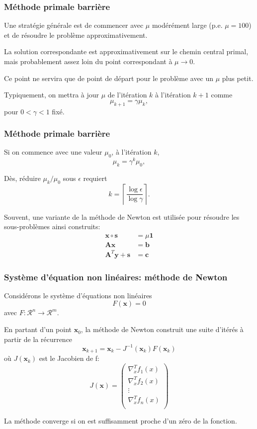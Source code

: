 \documentclass[usepdftitle=false]{beamer}
\def\bb{\boldsymbol{b}}
\def\bc{\boldsymbol{c}}
\def\bs{\boldsymbol{s}}
\def\bx{\boldsymbol{x}}
\def\by{\boldsymbol{y}}
\def\bA{\boldsymbol{A}}
\def\bone{\boldsymbol{1}}
\def\RR {\mathcal{R}}
\begin{document}
\begin{frame}
\frametitle{Méthode primale barrière}

Une stratégie générale est de commencer avec $\mu$ modérément large (p.e. $\mu = 100$) et de résoudre le problème approximativement.

\mbox{}

La solution correspondante est approximativement sur le chemin central primal, mais probablement assez loin du point correspondant à $\mu \rightarrow 0$.

\mbox{}

Ce point ne servira que de point de départ pour le problème avec un $\mu$ plus petit.

\mbox{}

Typiquement, on mettra à jour $\mu$ de l'itération $k$ à l'itération $k+1$ comme
\[
\mu_{k+1} = \gamma \mu_k,
\]
pour $0< \gamma < 1$ fixé.

\end{frame}

\begin{frame}
\frametitle{Méthode primale barrière}

Si on commence avec une valeur $\mu_0$, à l'itération $k$,
\[
\mu_{k} = \gamma^k \mu_0,
\]

\mbox{}

Dès, réduire $\mu_k/\mu_0$ sous $\epsilon$ requiert
\[
k = \left\lceil \frac{\log \epsilon}{\log \gamma} \right\rceil.
\]

\mbox{}

Souvent, une variante de la méthode de Newton est utilisée pour résoudre les sous-problèmes ainsi construits:
\begin{align*}
\bx \circ \bs &= \mu \bone \\
\bA\bx &= \bb \\
\bA^T\by + \bs & = \bc
\end{align*}

\end{frame}

\begin{frame}
\frametitle{Système d'équation non linéaires: méthode de Newton}

Considérons le système d'équations non linéaires
$$
F(\bx) = 0
$$
avec $F: \RR^n \rightarrow \RR^m$.

\mbox{}

En partant d'un point $\bx_0$, la méthode de Newton construit une suite d'itérés à partir de la récurrence
$$
\bx_{k+1} = \bx_k - J^{-1}(\bx_k) F(\bx_k)
$$
où $J(\bx_k)$ est le Jacobien de f:
\[
J(\bx) =
\begin{pmatrix}
\nabla^T_x f_1(x) \\
\nabla^T_x f_2(x) \\
\vdots \\
\nabla^T_x f_n(x) \\
\end{pmatrix}
\]

La méthode converge si on est suffisamment proche d'un zéro de la fonction.

\end{frame}
\end{document}
